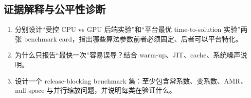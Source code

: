 \subsection*{证据解释与公平性诊断}
\begin{enumerate}[label=\arabic*.]
\item 分别设计“受控 CPU vs GPU 后端实验”和“平台最优 time-to-solution 实验”两张 benchmark card，指出哪些算法参数前者必须固定、后者可以平台特化。
\item 为什么只报告“最快一次”容易误导？结合 warm-up、JIT、cache、系统噪声说明。
\item 设计一个 release-blocking benchmark 集：至少包含常系数、变系数、AMR、null-space 与并行缩放问题，并说明每类在验证什么。
\end{enumerate}
